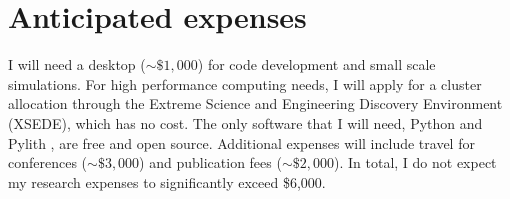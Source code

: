 \documentclass[12pt]{article}
\begin{document}
\newpage
\section*{Anticipated expenses}
I will need a desktop (${\sim}\$1,000$) for code development and small scale simulations.  For high performance computing needs, I will apply for a cluster allocation through the Extreme Science and Engineering Discovery Environment (XSEDE), which has no cost.  The only software that I will need, Python and Pylith \citep{Aagaard2013}, are free and open source.  Additional expenses will include travel for conferences (${\sim}\$3,000$) and publication fees (${\sim}\$2,000$). In total, I do not expect my research expenses to significantly exceed \$6,000.   



%


\end{document}
